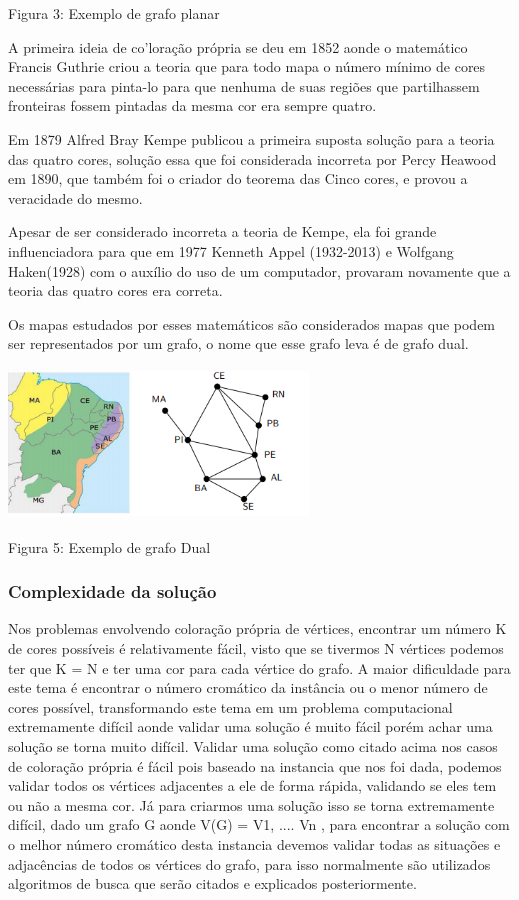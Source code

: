\documentclass[12pt]{article}
\begin{document}
     Figura 3:  Exemplo de grafo planar
     
    A primeira ideia de co'loração própria se deu em 1852 aonde o matemático Francis Guthrie criou a teoria que para todo mapa o número mínimo de cores necessárias para pinta-lo para que nenhuma de suas regiões que partilhassem fronteiras fossem pintadas da mesma cor era sempre quatro.
    
   
    Em 1879 Alfred Bray Kempe publicou a primeira suposta solução para a teoria das quatro cores, solução essa que foi considerada incorreta por Percy Heawood em 1890, que também foi o criador do teorema das Cinco cores, e provou a veracidade do mesmo.
    
    Apesar de ser considerado incorreta a teoria de Kempe, ela foi grande influenciadora para que em 1977 Kenneth Appel (1932-2013) e Wolfgang Haken(1928) com o auxílio do uso de um computador, provaram novamente que a teoria das quatro cores era correta.
    
    Os mapas estudados por esses matemáticos são considerados mapas que podem ser representados por um grafo, o nome que esse grafo leva é de grafo dual. 
    
     {\centering  \includegraphics[width=8cm,height=4cm]{grafoDual}\par}
   	
   	Figura 5: Exemplo de grafo Dual
   	
   	\subsubsection{Complexidade da solução}
   	
   	Nos problemas envolvendo coloração própria de vértices, encontrar um número K de cores possíveis é relativamente fácil, visto que se tivermos N vértices podemos ter que K = N e ter uma cor para cada vértice do grafo. A maior dificuldade para este tema é encontrar o número cromático da instância ou o menor número de cores possível, transformando este tema em um problema computacional extremamente difícil aonde validar uma solução é muito fácil porém achar uma solução se torna muito difícil.
   	Validar uma solução como citado acima nos casos de coloração própria é fácil pois baseado na instancia que nos foi dada, podemos validar todos os vértices adjacentes a ele de forma rápida, validando se eles tem ou não a mesma cor. Já para criarmos uma solução isso se torna extremamente difícil, dado um grafo G aonde V(G) = {V1, .... Vn }, para encontrar a solução com o melhor número cromático desta instancia devemos validar todas as situações e adjacências de todos os vértices do grafo, para isso normalmente são utilizados algoritmos de busca que serão citados e explicados posteriormente.
   	
\end{document}
